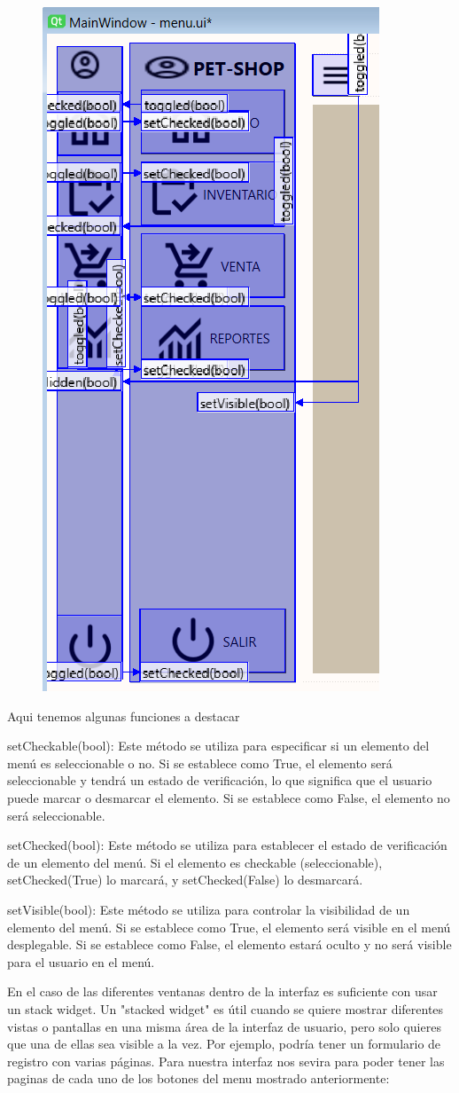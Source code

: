 \documentclass[11pt]{article}
\begin{document}
\begin{figure}[H]
		\begin{center}
 			\includegraphics[width = .4\textwidth]{06.png}
 			
		\end{center} 
\end{figure}

Aqui tenemos algunas funciones a destacar

setCheckable(bool): Este método se utiliza para especificar si un elemento del menú es seleccionable o no. Si se establece como True, el elemento será seleccionable y tendrá un estado de verificación, lo que significa que el usuario puede marcar o desmarcar el elemento. Si se establece como False, el elemento no será seleccionable.

setChecked(bool): Este método se utiliza para establecer el estado de verificación de un elemento del menú. Si el elemento es checkable (seleccionable), setChecked(True) lo marcará, y setChecked(False) lo desmarcará.

setVisible(bool): Este método se utiliza para controlar la visibilidad de un elemento del menú. Si se establece como True, el elemento será visible en el menú desplegable. Si se establece como False, el elemento estará oculto y no será visible para el usuario en el menú.

En el caso de las diferentes ventanas dentro de la interfaz es suficiente con usar un stack widget. Un "stacked widget" es útil cuando se quiere mostrar diferentes vistas o pantallas en una misma área de la interfaz de usuario, pero solo quieres que una de ellas sea visible a la vez. Por ejemplo, podría tener un formulario de registro con varias páginas. Para nuestra interfaz nos sevira para poder tener las paginas de cada uno de los botones del menu mostrado anteriormente:
\end{document}
